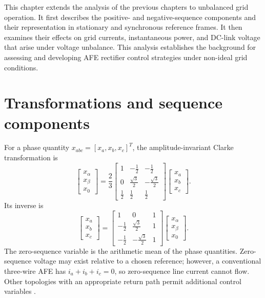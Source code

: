 This chapter extends the analysis of the previous chapters to unbalanced grid operation. It first describes the positive- and negative-sequence components and their representation in stationary and synchronous reference frames. It then examines their effects on grid currents, instantaneous power, and DC-link voltage that arise under voltage unbalance. This analysis establishes the background for assessing and developing AFE rectifier control strategies under non-ideal grid conditions.

\section{Transformations and sequence components}
For a phase quantity \(x_{abc}=[x_a,x_b,x_c]^T\), the amplitude-invariant Clarke transformation is
\begin{equation}\label{eq:ch4-clarke}
\begin{bmatrix}x_\alpha\\x_\beta\\x_0\end{bmatrix}=
\frac23\begin{bmatrix}1&-\frac12&-\frac12\\0&\frac{\sqrt3}{2}&-\frac{\sqrt3}{2}\\\frac12&\frac12&\frac12\end{bmatrix}
\begin{bmatrix}x_a\\x_b\\x_c\end{bmatrix}.
\end{equation}
Its inverse is
\begin{equation}
\begin{bmatrix}x_a\\x_b\\x_c\end{bmatrix}=
\begin{bmatrix}1&0&1\\-\frac12&\frac{\sqrt3}{2}&1\\-\frac12&-\frac{\sqrt3}{2}&1\end{bmatrix}
\begin{bmatrix}x_\alpha\\x_\beta\\x_0\end{bmatrix}.
\end{equation}
The zero-sequence variable is the arithmetic mean of the phase quantities. Zero-sequence voltage may exist relative to a chosen reference; however, a conventional three-wire AFE has \(i_a+i_b+i_c=0\), so zero-sequence line current cannot flow. Other topologies with an appropriate return path permit additional control variables \cite{ma2015}.


